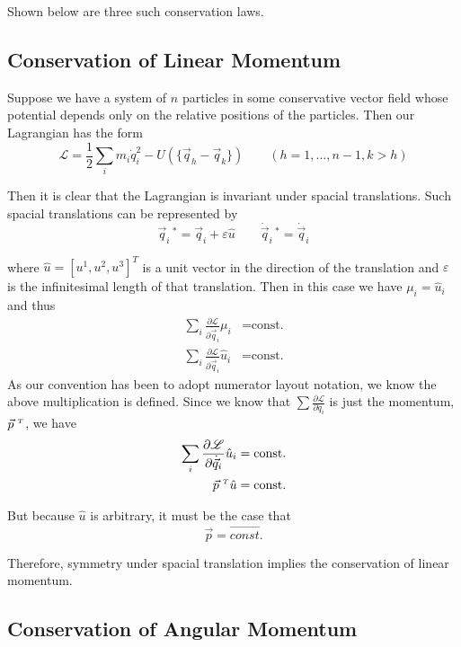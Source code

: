 \documentclass[12pt]{article}
\newcommand{\Lagr}	{\mathscr{L}}		%
\newcommand{\q}		{\vec{q}}
\newcommand{\p}		{\vec{p}}
\newcommand{\T}		{{\hspace{0.1cm} \scriptscriptstyle{T}}}
\begin{document}
Shown below are three such conservation laws.

\pagebreak
\subsection{Conservation of Linear Momentum}

Suppose we have a system of $n$ particles in some conservative vector field whose potential depends only on the relative positions of the particles. Then our Lagrangian has the form
\begin{equation*}
\Lagr = \frac{1}{2} \sum_i m_i \dot{q}_i^2 
		- U(\{  \vec{q}_h - \vec{q}_k  \}) 
		\qquad (h = 1, ... , n-1, k > h)
\end{equation*}

Then it is clear that the Lagrangian is invariant under spacial translations. Such spacial translations can be represented by
\begin{equation*}
\vec{q}_i\,^* = \vec{q}_i + \varepsilon \hat{u} \qquad
\dot{\vec{q}}_i\,^* = \dot{\vec{q}}_i
\end{equation*}

where $\hat{u} = [u^1, u^2, u^3]^T$ is a unit vector in the direction of the translation and $\varepsilon$ is the infinitesimal length of that translation. Then in this case we have $\mu_i = \hat{u}_i$ and thus
\begin{align*}
\sum_i \frac{\partial \Lagr}{\partial \dot{\q}_i} \mu_i 
	&= \text{const.} \\
\sum_i \frac{\partial \Lagr}{\partial \dot{\q}_i} \hat{u}_i 
	&= \text{const.}	
\end{align*}
As our convention has been to adopt numerator layout notation, we know the above multiplication is defined. Since we know that $\sum \frac{\partial \Lagr}{\partial \dot{q}_i}$ is just the momentum, $\p^\T$, we have
\begin{align*}	
\sum_i \frac{\partial \Lagr}{\partial \dot{\q}_i} \hat{u}_i 
				&= \text{const.} \\
\p^\T \hat{u}  	&= \text{const.}
\end{align*}

But because $\hat{u}$ is arbitrary, it must be the case that 
$$
\vec{p} = \vec{const.}
$$

Therefore, symmetry under spacial translation implies the conservation of linear momentum.

\pagebreak
\subsection{Conservation of Angular Momentum}
\end{document}
